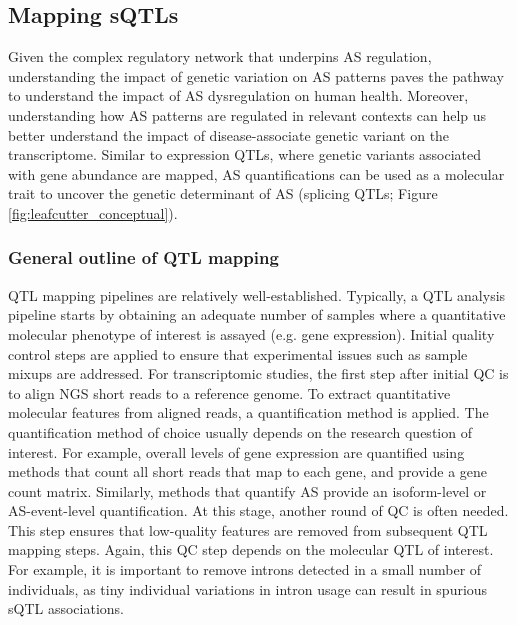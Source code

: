 \subsection{Mapping sQTLs}

Given the complex regulatory network that underpins AS regulation, understanding the impact of genetic variation on AS patterns paves the pathway to understand the impact of AS dysregulation on human health. Moreover, understanding how AS patterns are regulated in relevant contexts can help us better understand the impact of disease-associate genetic variant on the transcriptome. Similar to expression QTLs, where genetic variants associated with gene abundance are mapped, AS quantifications can be used as a molecular trait to uncover the genetic determinant of AS (splicing QTLs; Figure \ref{fig:leafcutter_conceptual}).\\

\subsubsection{General outline of QTL mapping}
QTL mapping pipelines are relatively well-established. Typically, a QTL analysis pipeline starts by obtaining an adequate number of samples where a quantitative molecular phenotype of interest is assayed (e.g. gene expression). Initial quality control steps are applied to ensure that experimental issues such as sample mixups are addressed. For transcriptomic studies, the first step after initial QC is to align NGS short reads to a reference genome. To extract quantitative molecular features from aligned reads, a quantification method is applied. The quantification method of choice usually depends on the research question of interest. For example, overall levels of gene expression are quantified using methods that count all short reads that map to each gene, and provide a gene count matrix. Similarly, methods that quantify AS provide an isoform-level or AS-event-level quantification. At this stage, another round of QC is often needed. This step ensures that low-quality features are removed from subsequent QTL mapping steps. Again, this QC step depends on the molecular QTL of interest. For example, it is important to remove introns detected in a small number of individuals, as tiny individual variations in intron usage can result in spurious sQTL associations. \\

